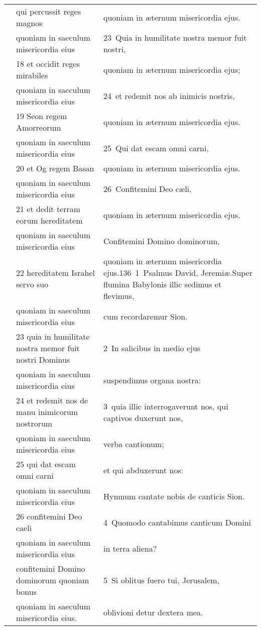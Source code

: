 \documentclass{article}
\begin{document}
\begin{longtable}{@{}p{}p{}p{}@{}}
	&	qui percussit reges magnos	&	quoniam in æternum misericordia ejus.	\\
	&	quoniam in saeculum misericordia eius	&	23 Quia in humilitate nostra memor fuit nostri,	\\
	&	18 et occidit reges mirabiles	&	quoniam in æternum misericordia ejus;	\\
	&	quoniam in saeculum misericordia eius	&	24 et redemit nos ab inimicis nostris,	\\
	&	19 Seon regem Amorreorum	&	quoniam in æternum misericordia ejus.	\\
	&	quoniam in saeculum misericordia eius	&	25 Qui dat escam omni carni,	\\
	&	20 et Og regem Basan	&	quoniam in æternum misericordia ejus.	\\
	&	quoniam in saeculum misericordia eius	&	26 Confitemini Deo cæli,	\\
	&	21 et dedit terram eorum hereditatem	&	quoniam in æternum misericordia ejus.	\\
	&	quoniam in saeculum misericordia eius	&	Confitemini Domino dominorum,	\\
	&	22 hereditatem Israhel servo suo	&	quoniam in æternum misericordia ejus.136 1 Psalmus David, Jeremiæ.Super flumina Babylonis illic sedimus et flevimus,	\\
	&	quoniam in saeculum misericordia eius	&	cum recordaremur Sion.	\\
	&	23 quia in humilitate nostra memor fuit nostri Dominus	&	2 In salicibus in medio ejus	\\
	&	quoniam in saeculum misericordia eius	&	suspendimus organa nostra:	\\
	&	24 et redemit nos de manu inimicorum nostrorum	&	3 quia illic interrogaverunt nos, qui captivos duxerunt nos,	\\
	&	quoniam in saeculum misericordia eius	&	verba cantionum;	\\
	&	25 qui dat escam omni carni	&	et qui abduxerunt nos:	\\
	&	quoniam in saeculum misericordia eius	&	Hymnum cantate nobis de canticis Sion.	\\
	&	26 confitemini Deo caeli	&	4 Quomodo cantabimus canticum Domini	\\
	&	quoniam in saeculum misericordia eius	&	in terra aliena?	\\
	&	confitemini Domino dominorum quoniam bonus	&	5 Si oblitus fuero tui, Jerusalem,	\\
	&	quoniam in saeculum misericordia eius.	&	oblivioni detur dextera mea.	\\

\end{longtable}
\end{document}
